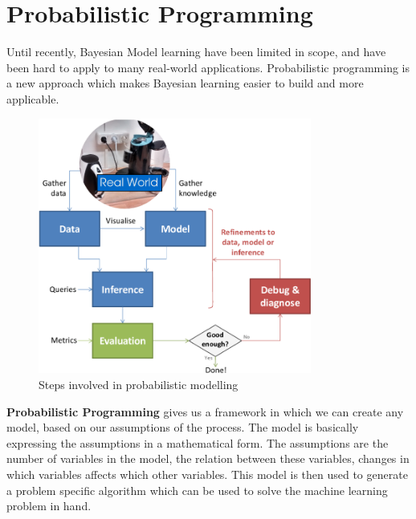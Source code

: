 \section{Probabilistic Programming}

Until recently, Bayesian Model learning have been limited in scope, and have been hard to apply to many real-world applications. Probabilistic programming is a new approach which makes Bayesian learning easier to build and more applicable. 


\begin{figure}[htp]
\centering
\includegraphics[width=0.8\textwidth]{pictures/Lifecycle.png}
\caption[Steps involved in probabilistic modelling ]{Steps involved in probabilistic modelling  \protect\footnotemark }
\label{}
\end{figure}

\textbf{Probabilistic Programming} gives us a framework in which we can create any model, based on our assumptions of the process. The model is basically expressing the assumptions in a mathematical form. The assumptions are the number of variables in the model, the relation between these variables, changes in which variables affects which other variables. This model is then used to generate a problem specific algorithm which can be used to solve the machine learning problem in hand. 

